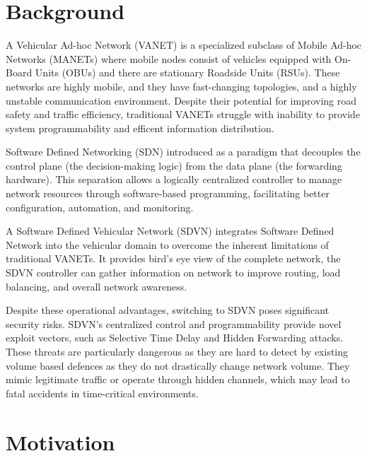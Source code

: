 \documentclass[12pt, a4paper]{report}
\begin{document}
\section{Background}

A Vehicular Ad-hoc Network (VANET) is a specialized subclass of Mobile Ad-hoc Networks (MANETs) where mobile nodes consist of vehicles equipped with On-Board Units (OBUs) and there are  stationary Roadside Units (RSUs)\cite{Cardona_2020}\cite{s23031600}. These networks are highly mobile, and they have fast-changing topologies, and a highly unstable communication environment\cite{Cardona_2020}\cite{s23031600}. Despite their potential for improving road safety and traffic efficiency, traditional VANETs struggle with inability to provide system programmability and efficent information distribution\cite{KALUPAHANALIYANAGE2018226}\cite{s23031600}.

Software Defined Networking (SDN) introduced as a paradigm that decouples the control plane (the decision-making logic) from the data plane (the forwarding hardware)\cite{PASCOAL2020107223}. This separation allows a logically centralized controller to manage network resources through software-based programming, facilitating better configuration, automation, and monitoring\cite{PASCOAL2020107223}.

A Software Defined Vehicular Network (SDVN) integrates Software Defined Network into the vehicular domain to overcome the inherent limitations of traditional VANETs\cite{KALUPAHANALIYANAGE2018226}\cite{s23031600}. It provides bird’s eye view of the complete network, the SDVN controller can gather information on network to improve routing, load balancing, and overall network awareness.

Despite these operational advantages, switching to SDVN poses significant security risks. SDVN's centralized control and programmability provide novel exploit vectors, such as Selective Time Delay and Hidden Forwarding attacks\cite{9088232}. These threats are particularly dangerous as they are hard to detect by existing volume based defences as they do not drastically change network volume. They mimic legitimate traffic or operate through hidden channels, which may lead to fatal accidents in time-critical environments\cite{PASCOAL2020107223}.

\section{Motivation}
\end{document}
